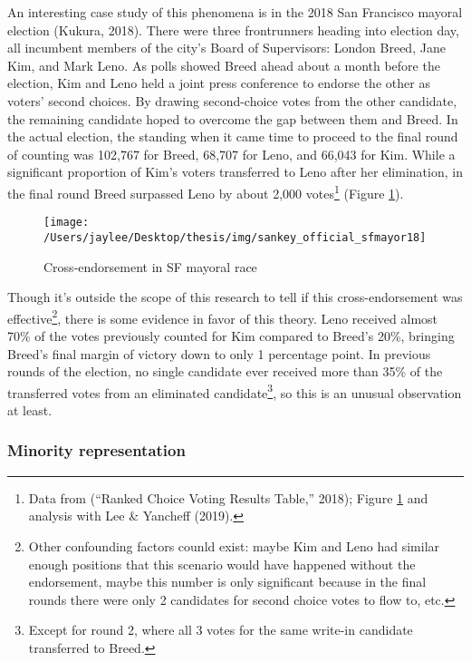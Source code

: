 \documentclass[12pt,twoside]{reedthesis}
\begin{document}
An interesting case study of this phenomena is in the 2018 San Francisco mayoral election (Kukura, 2018). There were three frontrunners heading into election day, all incumbent members of the city's Board of Supervisors: London Breed, Jane Kim, and Mark Leno. As polls showed Breed ahead about a month before the election, Kim and Leno held a joint press conference to endorse the other as voters' second choices. By drawing second-choice votes from the other candidate, the remaining candidate hoped to overcome the gap between them and Breed. In the actual election, the standing when it came time to proceed to the final round of counting was 102,767 for Breed, 68,707 for Leno, and 66,043 for Kim. While a significant proportion of Kim's voters transferred to Leno after her elimination, in the final round Breed surpassed Leno by about 2,000 votes\footnote{Data from (``Ranked Choice Voting Results Table,'' 2018); Figure \ref{fig:sankey} and analysis with Lee \& Yancheff (2019).} (Figure \ref{fig:sankey}).
\begin{figure}
\texttt{[image: /Users/jaylee/Desktop/thesis/img/sankey\_official\_sfmayor18]} \caption{Cross-endorsement in SF mayoral race}\label{fig:sankey}
\end{figure}
Though it's outside the scope of this research to tell if this cross-endorsement was effective\footnote{Other confounding factors counld exist: maybe Kim and Leno had similar enough positions that this scenario would have happened without the endorsement, maybe this number is only significant because in the final rounds there were only 2 candidates for second choice votes to flow to, etc.}, there is some evidence in favor of this theory. Leno received almost 70\% of the votes previously counted for Kim compared to Breed's 20\%, bringing Breed's final margin of victory down to only 1 percentage point. In previous rounds of the election, no single candidate ever received more than 35\% of the transferred votes from an eliminated candidate\footnote{Except for round 2, where all 3 votes for the same write-in candidate transferred to Breed.}, so this is an unusual observation at least.

\hypertarget{minority-representation}{%
\subsubsection{Minority representation}\label{minority-representation}}
\end{document}
